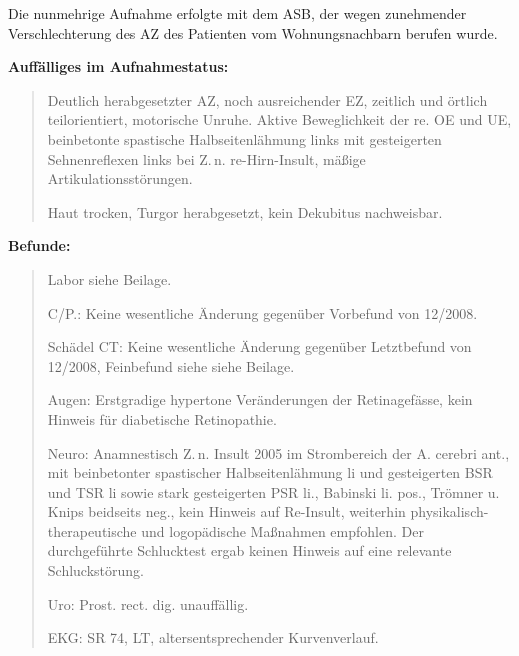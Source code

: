 { Die nunmehrige Aufnahme erfolgte mit dem ASB, der wegen zunehmender
 Verschlechterung des AZ des Patienten vom Wohnungsnachbarn
 berufen wurde.

{\bfseries Auffälliges im Aufnahmestatus:}

\begin{quote}
 Deutlich herabgesetzter AZ, noch ausreichender EZ, zeitlich
 und örtlich teilorientiert, motorische Unruhe. Aktive
 Beweglichkeit der re. OE und UE, beinbetonte spastische
 Halbseitenlähmung links mit gesteigerten Sehnenreflexen
 links bei Z.\,n. re-Hirn-Insult, mäßige
 Artikulationsstörungen.
 
 Haut trocken, Turgor herabgesetzt, kein Dekubitus
 nachweisbar.
 \end{quote}

{\bfseries Befunde:}
\begin{quote}
Labor siehe Beilage.

C/P.: Keine
wesentliche Änderung gegenüber Vorbefund von 12/2008.

Schädel CT: Keine wesentliche Änderung gegenüber Letztbefund
von 12/2008, Feinbefund siehe siehe Beilage.

Augen: Erstgradige hypertone Veränderungen der
Retinagefässe, kein Hinweis
für diabetische
Retinopathie.

Neuro: Anamnestisch Z.\,n. Insult 2005 im Strombereich der
A. cerebri ant., mit beinbetonter spastischer Halbseitenlähmung
li und gesteigerten BSR und TSR li sowie stark gesteigerten
PSR li., Babinski li. pos., Trömner u. Knips
beidseits neg., kein Hinweis auf Re-Insult, weiterhin
physi\-ka\-lisch- thera\-peutische und logopädische
Maßnahmen empfohlen. Der durchgeführte Schlucktest ergab
keinen Hinweis auf eine relevante Schluckstörung.

Uro: Prost. rect. dig. unauffällig.

EKG: SR 74, LT, altersentsprechender Kurvenverlauf.


\end{quote}}
